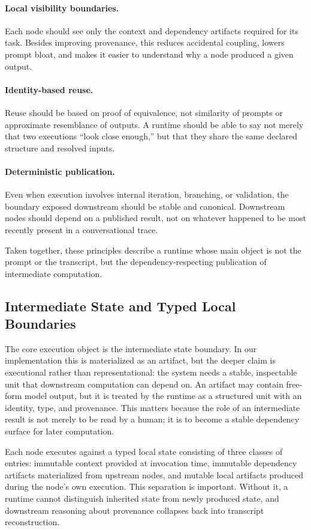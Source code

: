 \documentclass{article}
\begin{document}
\paragraph{Local visibility boundaries.}
Each node should see only the context and dependency artifacts required for its task. Besides improving provenance, this reduces accidental coupling, lowers prompt bloat, and makes it easier to understand why a node produced a given output.

\paragraph{Identity-based reuse.}
Reuse should be based on proof of equivalence, not similarity of prompts or approximate resemblance of outputs. A runtime should be able to say not merely that two executions ``look close enough,'' but that they share the same declared structure and resolved inputs.

\paragraph{Deterministic publication.}
Even when execution involves internal iteration, branching, or validation, the boundary exposed downstream should be stable and canonical. Downstream nodes should depend on a published result, not on whatever happened to be most recently present in a conversational trace.

Taken together, these principles describe a runtime whose main object is not the prompt or the transcript, but the dependency-respecting publication of intermediate computation.

\subsection{Intermediate State and Typed Local Boundaries}

The core execution object is the intermediate state boundary. In our implementation this is materialized as an artifact, but the deeper claim is executional rather than representational: the system needs a stable, inspectable unit that downstream computation can depend on. An artifact may contain free-form model output, but it is treated by the runtime as a structured unit with an identity, type, and provenance. This matters because the role of an intermediate result is not merely to be read by a human; it is to become a stable dependency surface for later computation.

Each node executes against a typed local state consisting of three classes of entries: immutable context provided at invocation time, immutable dependency artifacts materialized from upstream nodes, and mutable local artifacts produced during the node's own execution. This separation is important. Without it, a runtime cannot distinguish inherited state from newly produced state, and downstream reasoning about provenance collapses back into transcript reconstruction.
\end{document}

